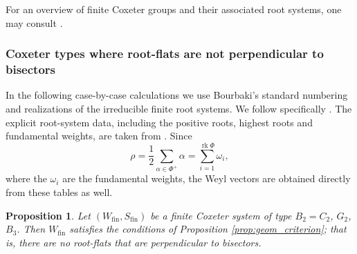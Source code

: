 \documentclass[11pt]{amsart}
\theoremstyle{plain}
\newtheorem{prop}[thm]{Proposition}
\theoremstyle{definition}
\theoremstyle{remark}
\begin{document}
	For an overview of finite Coxeter groups and their associated root systems, one may consult \cite[pp.~22--24]{SamMetaplecticNotes}. 
	

	
	\subsubsection{Coxeter types where root-flats are not perpendicular to bisectors}
	\label{subsec::not_perp_bisectors}
	
	In the following case-by-case calculations we use Bourbaki's standard numbering and realizations of the irreducible finite root systems. We follow specifically \cite[Ch.~IV, \S1]{bourbaki_IV-VI_02}. The explicit root-system data, including the positive roots, highest roots and fundamental weights, are taken from \cite[Ch.~VI, \S1, nos.~6, 8--10,
	and Planches~I--IX]{bourbaki_IV-VI_02}.  Since
	\[
	\rho=\frac12\sum_{\alpha\in\Phi^+}\alpha
	=\sum_{i=1}^{\operatorname{rk}\Phi}\omega_i,
	\]
	where the \(\omega_i\) are the fundamental weights, the Weyl vectors are obtained directly from these tables as well. 
	
	\begin{prop}
		Let \((W_{\mathrm{fin}}, S_{\mathrm{fin}})\) be a finite Coxeter system of type \( B_2 = C_2 \), \( G_2 \), \( B_3 \). Then \( W_{\mathrm{fin}} \) satisfies the conditions of Proposition \ref{prop:geom_criterion}; that is, there are no root-flats that are perpendicular to bisectors.
	\end{prop}
	
\end{document}

